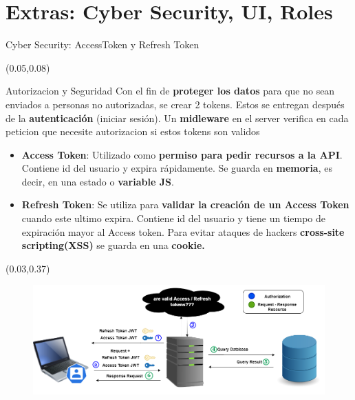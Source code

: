 \documentclass[xcolor=pdftex,dvipsnames,table]{beamer}
\begin{document}
\section{Extras: Cyber Security, UI, Roles}
\begin{frame}{Cyber Security: AccessToken y Refresh Token }
    \scriptsize {
    \begin{textblock*}{0.95\textwidth}(0.05\textwidth,0.08\textwidth)
            \begin{block}{Autorizacion y Seguridad} 
            \justifying
                Con el fin de \textbf{proteger los datos} para que no sean enviados a personas no autorizadas, se crear 2 tokens. Estos se entregan después de la \textbf{autenticación} (iniciar sesión). Un  \textbf{midleware} en el server verifica en cada peticion que necesite autorizacion si estos tokens son validos
                    \vspace{-0.04cm}
                    \scriptsize{
                    \begin{itemize}
                      \setlength\itemsep{0.1em}
                        \item {\textbf{Access Token}: Utilizado como  \textbf{permiso para pedir recursos a la API}. Contiene id del usuario y expira rápidamente. Se guarda en  \textbf{memoria}, es decir, en una estado o \textbf{variable JS}.}
                        \item {\textbf{Refresh Token}: Se utiliza para  \textbf{validar la creación de un Access Token} cuando este ultimo expira. Contiene id del usuario y tiene un tiempo de expiración mayor al Access token. Para evitar ataques de hackers  \textbf{cross-site scripting(XSS)} se guarda en una  \textbf{cookie.} }
                    \end{itemize}}
            \end{block}
    \end{textblock*}}
    
    
    \begin{textblock*}{1\textwidth}(0.03\textwidth,0.37\textwidth)
        \begin{figure}
            \centering
            \includegraphics[width=1\linewidth]{cyber/2SEGURITY.png}
            \label{fig:my_label}
        \end{figure}
    \end{textblock*}
\end{frame}
\end{document}
